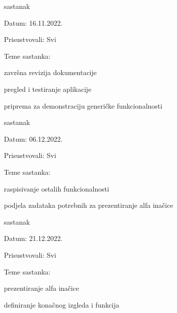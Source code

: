 \begin{packed_enum}
            \item sastanak
        
        \item[] \begin{packed_item}
				\item Datum: 16.11.2022.
				\item Prisustvovali: Svi
				\item Teme sastanka:
				\begin{packed_item}
					\item  završna revizija dokumentacije
					\item  pregled i testiranje aplikacije
                        \item  priprema za demonstraciju generičke funkcionalnosti
				\end{packed_item}
			\end{packed_item}
            \eject
            \item sastanak
        
        \item[] \begin{packed_item}
				\item Datum: 06.12.2022.
				\item Prisustvovali: Svi
				\item Teme sastanka:
				\begin{packed_item}
					\item  raspisivanje ostalih funkcionalnosti
					\item  podjela zadataka potrebnih za prezentiranje alfa inačice
				\end{packed_item}
			\end{packed_item}

            \item sastanak
        
        \item[] \begin{packed_item}
				\item Datum: 21.12.2022.
				\item Prisustvovali: Svi
				\item Teme sastanka:
				\begin{packed_item}
					\item  prezentiranje alfa inačice
					\item  definiranje konačnog izgleda i funkcija
				\end{packed_item}
			\end{packed_item}


\end{packed_enum}
